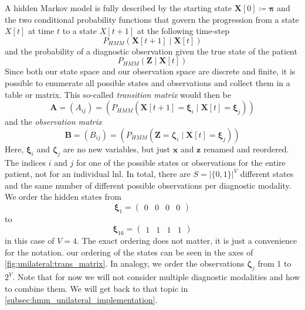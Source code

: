 \documentclass[\relativeRoot/main.tex]{subfiles}
\begin{document}
A hidden Markov model is fully described by the starting state $\mathbf{X}[0] \coloneqq \boldsymbol{\pi}$ and the two conditional probability functions that govern the progression from a state $X[t]$ at time $t$ to a state $X[t+1]$ at the following time-step
%
\begin{equation}
    P_{HMM}\left( \mathbf{X}[t+1] \mid \mathbf{X}[t] \right)
\end{equation}
%
and the probability of a diagnostic observation given the true state of the patient
%
\begin{equation}
    P_{HMM}\left( \mathbf{Z} \mid \mathbf{X}[t] \right)
\end{equation}
%
Since both our state space and our observation space are discrete and finite, it is possible to enumerate all possible states and observations and collect them in a table or matrix. This so-called \emph{transition matrix} would then be
%
\begin{equation}
    \mathbf{A} = \left( A_{ij} \right) = \left( P_{HMM} \left( \mathbf{X}[t+1] = \boldsymbol{\xi}_i \mid \mathbf{X}[t] = \boldsymbol{\xi}_j \right) \right)
\end{equation}
%
and the \emph{observation matrix}
%
\begin{equation}
    \mathbf{B} = \left( B_{ij} \right) = \left( P_{HMM} \left( \mathbf{Z} = \boldsymbol{\zeta}_i \mid \mathbf{X}[t] = \boldsymbol{\xi}_j \right) \right)
\end{equation}
%
Here, $\boldsymbol{\xi}_i$ and $\boldsymbol{\zeta}_j$ are no new variables, but just $\mathbf{x}$ and $\mathbf{z}$ renamed and reordered. The indices $i$ and $j$ for one of the possible states or observations for the entire patient, not for an individual \gls{lnl}. In total, there are $S = |\{ 0,1 \}|^V$ different states and the same number of different possible observations per diagnostic modality. We order the hidden states from
%
\begin{equation}
    \boldsymbol{\xi}_1 = 
    \begin{pmatrix}
        0 & 0 & 0 & 0
    \end{pmatrix}
\end{equation}
%
to
%
\begin{equation} \label{eq:unilateral:formulation:obs_matrix}
    \boldsymbol{\xi}_{16} = 
    \begin{pmatrix}
        1 & 1 & 1 & 1
    \end{pmatrix}
\end{equation}
%
in this case of $V = 4$. The exact ordering does not matter, it is just a convenience for the notation. our ordering of the states can be seen in the axes of \cref{fig:unilateral:trans_matrix}. In analogy, we order the observations $\boldsymbol{\zeta}_j$ from 1 to $2^V$. Note that for now we will not consider multiple diagnostic modalities and how to combine them. We will get back to that topic in \cref{subsec:hmm_unilateral_implementation}.
\end{document}
